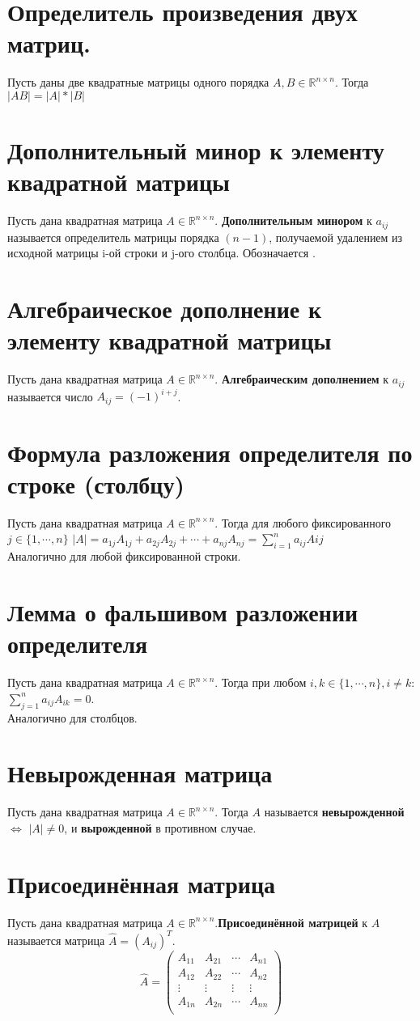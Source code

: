 \documentclass[a4paper,11pt]{report}
\begin{document}
\section{Определитель произведения двух матриц.}
Пусть даны две квадратные матрицы одного порядка $A, B \in \mathbb{R}^{n\times{n}}$. Тогда
$|AB| = |A| * |B|$
\section{Дополнительный минор к элементу квадратной матрицы}
Пусть дана квадратная матрица $A \in \mathbb{R}^{n\times{n}}$. \textbf{Дополнительным минором} к $a_{ij}$ называется
определитель матрицы порядка $(n - 1)$, получаемой удалением из исходной матрицы i-ой строки и j-ого столбца.
Обозначается .
\section{Алгебраическое дополнение к элементу квадратной матрицы}
Пусть дана квадратная матрица $A \in \mathbb{R}^{n\times{n}}$. \textbf{Алгебраическим дополнением} к $a_{ij}$ называется
число $A_{ij} = (-1)^{i + j}$.
\section{Формула разложения определителя по строке (столбцу)}
Пусть дана квадратная матрица $A \in \mathbb{R}^{n\times{n}}$. Тогда для любого фиксированного $j \in \{1, \cdots, n\}$
$|A| = a_{1j}A_{1j} + a_{2j}A_{2j} + \cdots + a_{nj}A_{nj} = \sum\limits_{i = 1}^n{a_{ij}A{ij}}$\\
Аналогично для любой фиксированной строки.
\section{Лемма о фальшивом разложении определителя}
Пусть дана квадратная матрица $A \in \mathbb{R}^{n\times{n}}$. Тогда при любом $i, k \in \{1, \cdots, n\}, i \neq k$:
$\sum\limits_{j = 1}^n{a_{ij}A_{ik}} = 0$.\\
Аналогично для столбцов.
\section{Невырожденная матрица}
Пусть дана квадратная матрица $A \in \mathbb{R}^{n\times{n}}$. Тогда $A$ называется \textbf{невырожденной} $\Leftrightarrow$
$|A| \neq 0$, и \textbf{вырожденной} в противном случае.
\section{Присоединённая матрица}
Пусть дана квадратная матрица $A \in \mathbb{R}^{n\times{n}}$.\textbf{Присоединённой матрицей} к $A$ называется
матрица $\hat{A} = (A_{ij})^T$.
\[
\hat{A} = 
\begin{pmatrix}
A_{11} & A_{21} & \cdots & A_{n1}\\
A_{12} & A_{22} & \cdots & A_{n2}\\
\vdots & \vdots & \vdots & \vdots\\
A_{1n} & A_{2n} & \cdots & A_{nn}\\
\end{pmatrix}
\]
\end{document}
